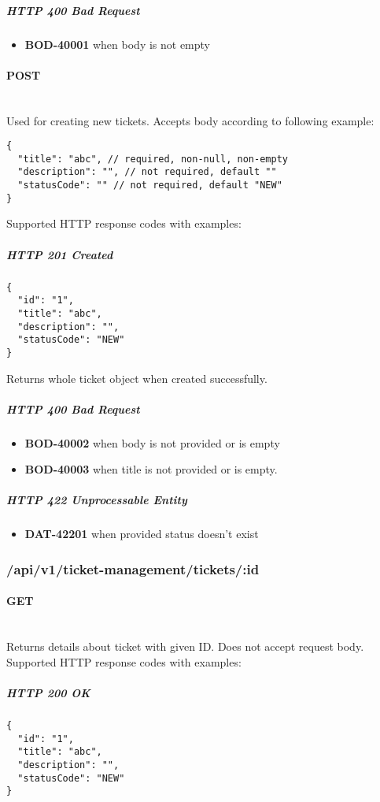 \documentclass[a4paper]{article}
\newcommand{\newLineParagraph}[1]{\paragraph{#1}\mbox{}\\}
\begin{document}
    \subparagraph{HTTP 400 Bad Request}
    \begin{itemize}
        \item \textbf{BOD-40001} when body is not empty
    \end{itemize}

    \newLineParagraph{POST}
    Used for creating new tickets. Accepts body according to following example:
    \begin{verbatim}
{
  "title": "abc", // required, non-null, non-empty
  "description": "", // not required, default ""
  "statusCode": "" // not required, default "NEW"
}
    \end{verbatim}
    Supported HTTP response codes with examples:

    \subparagraph{HTTP 201 Created}
    \begin{verbatim}
{
  "id": "1",
  "title": "abc",
  "description": "",
  "statusCode": "NEW"
}
    \end{verbatim}
    Returns whole ticket object when created successfully.

    \subparagraph{HTTP 400 Bad Request}
    \begin{itemize}
        \item \textbf{BOD-40002} when body is not provided or is empty
        \item \textbf{BOD-40003} when title is not provided or is empty.
    \end{itemize}

    \subparagraph{HTTP 422 Unprocessable Entity}
    \begin{itemize}
        \item \textbf{DAT-42201} when provided status doesn't exist
    \end{itemize}

    \subsubsection{/api/v1/ticket-management/tickets/:id}

    \newLineParagraph{GET}
    Returns details about ticket with given ID. Does not accept request body. \\
    Supported HTTP response codes with examples:

    \subparagraph{HTTP 200 OK}
    \begin{verbatim}
{
  "id": "1",
  "title": "abc",
  "description": "",
  "statusCode": "NEW"
}
    \end{verbatim}
\end{document}
